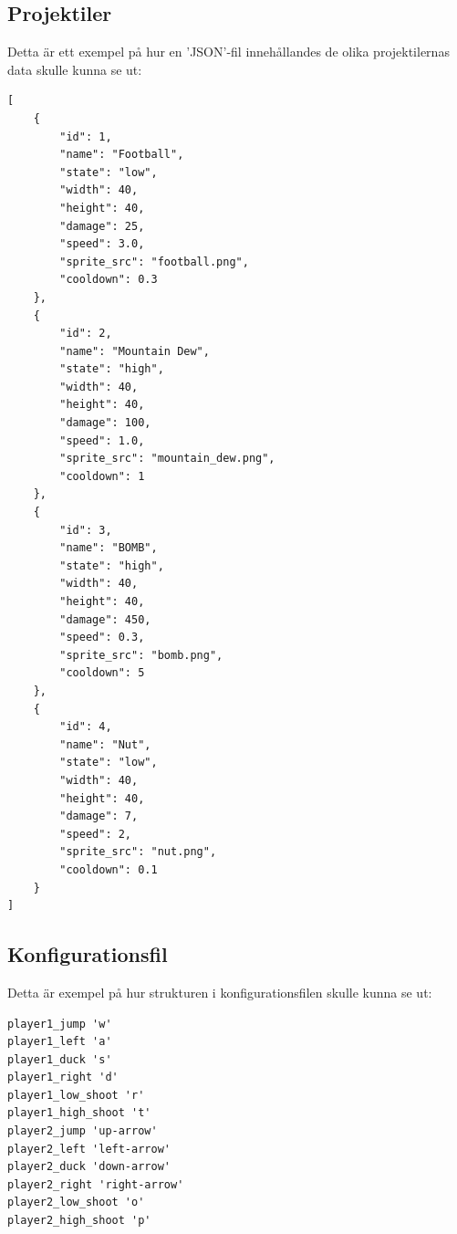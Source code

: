 \documentclass{TDP003mall}
\begin{document}
\subsection{Projektiler}
Detta är ett exempel på hur en 'JSON'-fil innehållandes de olika projektilernas data skulle kunna se ut:
\begin{lstlisting}[backgroundcolor = \color{lightgray}]
[
	{
		"id": 1,
		"name": "Football",
		"state": "low",
		"width": 40,
		"height": 40,
		"damage": 25,
		"speed": 3.0,
		"sprite_src": "football.png",
		"cooldown": 0.3
	},
	{
		"id": 2,
		"name": "Mountain Dew",
		"state": "high",
		"width": 40,
		"height": 40,
		"damage": 100,
		"speed": 1.0,
		"sprite_src": "mountain_dew.png",
		"cooldown": 1
	},
	{
		"id": 3,
		"name": "BOMB",
		"state": "high",
		"width": 40,
		"height": 40,
		"damage": 450,
		"speed": 0.3,
		"sprite_src": "bomb.png",
		"cooldown": 5
	},
	{
		"id": 4,
		"name": "Nut",
		"state": "low",
		"width": 40,
		"height": 40,
		"damage": 7,
		"speed": 2,
		"sprite_src": "nut.png",
		"cooldown": 0.1
	}
]
\end{lstlisting}

\newpage

\subsection{Konfigurationsfil}
Detta är exempel på hur strukturen i konfigurationsfilen skulle kunna se ut:
\begin{lstlisting}[backgroundcolor = \color{lightgray}]
player1_jump 'w'
player1_left 'a'
player1_duck 's'
player1_right 'd'
player1_low_shoot 'r'
player1_high_shoot 't'
player2_jump 'up-arrow'
player2_left 'left-arrow'
player2_duck 'down-arrow'
player2_right 'right-arrow'
player2_low_shoot 'o'
player2_high_shoot 'p'
\end{lstlisting}
\end{document}
